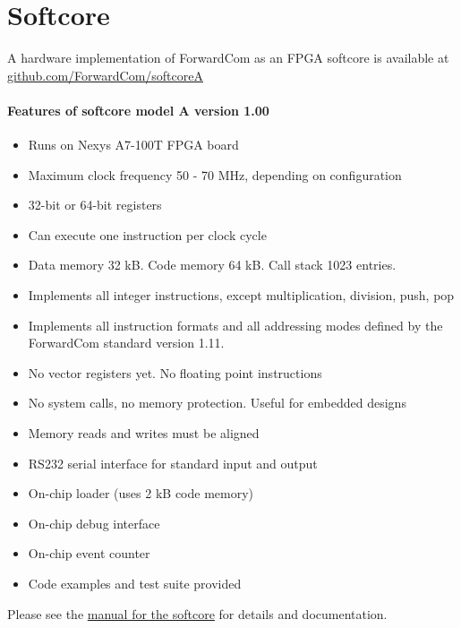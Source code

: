 \documentclass[forwardcom.tex]{subfiles}
\begin{document}
\RaggedRight

\chapter{Softcore}
A hardware implementation of ForwardCom as an FPGA softcore is available at \\
\href{https://github.com/ForwardCom/softcoreA}{github.com/ForwardCom/softcoreA}
\vv

\subsubsection{Features of softcore model A version 1.00}
\begin{itemize}
\item Runs on Nexys A7-100T FPGA board
\item Maximum clock frequency 50 - 70 MHz, depending on configuration
\item 32-bit or 64-bit registers
\item Can execute one instruction per clock cycle
\item Data memory 32 kB. Code memory 64 kB. Call stack 1023 entries.
\item Implements all integer instructions, except multiplication, division, push, pop
\item Implements all instruction formats and all addressing modes defined by the ForwardCom standard version 1.11.
\item No vector registers yet. No floating point instructions
\item No system calls, no memory protection. Useful for embedded designs
\item Memory reads and writes must be aligned
\item RS232 serial interface for standard input and output
\item On-chip loader (uses 2 kB code memory)
\item On-chip debug interface
\item On-chip event counter
\item Code examples and test suite provided
\end{itemize}
\vv

Please see the 
\href{https://github.com/ForwardCom/softcoreA/raw/main/softcore_A.pdf}{manual for the softcore} 
for details and documentation.
\vv
\end{document}

